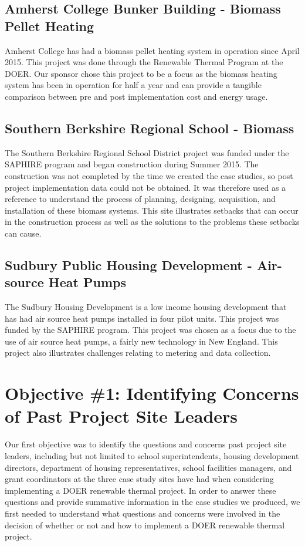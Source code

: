     \subsection{Amherst College Bunker Building - Biomass Pellet Heating}
    \par Amherst College has had a biomass pellet heating system in operation since April 2015. This project was done through the Renewable Thermal Program at the DOER. Our sponsor chose this project to be a focus as the biomass heating system has been in operation for half a year and can provide a tangible comparison between pre and post implementation cost and energy usage.

    \subsection{Southern Berkshire Regional School - Biomass}
    \par The Southern Berkshire Regional School District project was funded under the SAPHIRE program and began construction during Summer 2015. The construction was not completed by the time we created the case studies, so post project implementation data could not be obtained. It was therefore used as a reference to understand the process of planning, designing, acquisition, and installation of these biomass systems. This site illustrates setbacks that can occur in the construction process as well as the solutions to the problems these setbacks can cause.

    \subsection{Sudbury Public Housing Development - Air-source Heat Pumps}
    \par The Sudbury Housing Development is a low income housing development that has had air source heat pumps installed in four pilot units. This project was funded by the SAPHIRE program. This project was chosen as a focus due to the use of air source heat pumps, a fairly new technology in New England. This project also illustrates challenges relating to metering and data collection.

  \section{Objective \#1: Identifying Concerns of Past Project Site Leaders}
  \par Our first objective was to identify the questions and concerns past project site leaders, including but not limited to school superintendents, housing development directors, department of housing representatives, school facilities managers, and grant coordinators at the three case study sites have had when considering implementing a DOER renewable thermal project. In order to answer these questions and provide summative information in the case studies we produced, we first needed to understand what questions and concerns were involved in the decision of whether or not and how to implement a DOER renewable thermal project. 

